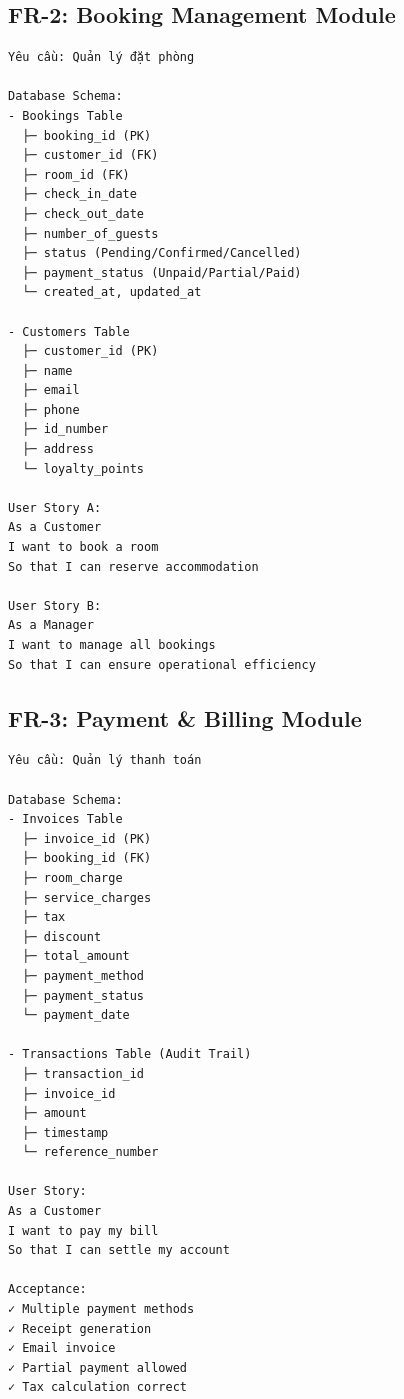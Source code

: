 \documentclass[12pt, a4paper]{report}
\begin{document}
\subsection{FR-2: Booking Management Module}

\begin{tcolorbox}[colback=blue!5]
\begin{lstlisting}
Yêu cầu: Quản lý đặt phòng

Database Schema:
- Bookings Table
  ├─ booking_id (PK)
  ├─ customer_id (FK)
  ├─ room_id (FK)
  ├─ check_in_date
  ├─ check_out_date
  ├─ number_of_guests
  ├─ status (Pending/Confirmed/Cancelled)
  ├─ payment_status (Unpaid/Partial/Paid)
  └─ created_at, updated_at

- Customers Table
  ├─ customer_id (PK)
  ├─ name
  ├─ email
  ├─ phone
  ├─ id_number
  ├─ address
  └─ loyalty_points

User Story A:
As a Customer
I want to book a room
So that I can reserve accommodation

User Story B:
As a Manager
I want to manage all bookings
So that I can ensure operational efficiency
\end{lstlisting}
\end{tcolorbox}

\subsection{FR-3: Payment & Billing Module}

\begin{tcolorbox}[colback=orange!5]
\begin{lstlisting}
Yêu cầu: Quản lý thanh toán

Database Schema:
- Invoices Table
  ├─ invoice_id (PK)
  ├─ booking_id (FK)
  ├─ room_charge
  ├─ service_charges
  ├─ tax
  ├─ discount
  ├─ total_amount
  ├─ payment_method
  ├─ payment_status
  └─ payment_date

- Transactions Table (Audit Trail)
  ├─ transaction_id
  ├─ invoice_id
  ├─ amount
  ├─ timestamp
  └─ reference_number

User Story:
As a Customer
I want to pay my bill
So that I can settle my account

Acceptance:
✓ Multiple payment methods
✓ Receipt generation
✓ Email invoice
✓ Partial payment allowed
✓ Tax calculation correct
\end{lstlisting}
\end{tcolorbox}

\newpage
\end{document}
